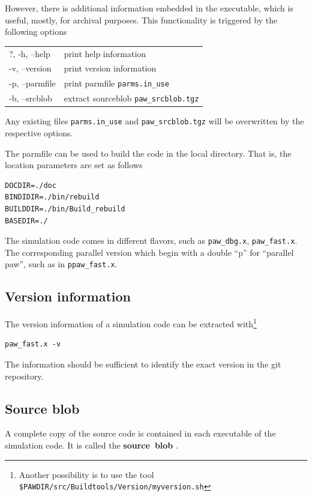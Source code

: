 \documentclass[final,12pt,makeidx,DIV=calc]{article}
\begin{document}
{{{However, there is additional information embedded in the executable,
which is useful, mostly, for archival purposes. This functionality is
triggered by the following options
\begin{center}
\begin{tabular}{ll}
?, -h, --help & print help information\\
-v, --version & print version information\\
-p, --parmfile & print parmfile \verb|parms.in_use|\\
-b, --srcblob  & extract sourceblob \verb|paw_srcblob.tgz| \\
\end{tabular}
\end{center}
Any existing files \verb|parms.in_use| and \verb|paw_srcblob.tgz| will
be overwritten by the respective options.

The parmfile can be used to build the code in the local
directory. That is, the location  parameters are set as follows
\begin{verbatim}
DOCDIR=./doc
BINDIDIR=./bin/rebuild
BUILDDIR=./bin/Build_rebuild
BASEDIR=./
\end{verbatim}


The simulation code comes in different flavors, such as
\verb|paw_dbg.x|, \verb|paw_fast.x|. The corresponding parallel
version which begin with a double ``p'' for ``parallel paw'', such as
in \verb|ppaw_fast.x|.



\subsection{Version information}
The version information of a simulation code can be extracted
with\footnote{Another possibility is to use the tool
\texttt{\${PAWDIR}/src/Buildtools/Version/myversion.sh}}
\begin{verbatim}
paw_fast.x -v
\end{verbatim}
The information should be sufficient to identify the exact version in
the git repository.


\subsection{Source blob}
A complete copy of the source code is contained in each executable of
the simulation code. It is called the \textbf{source~blob}
.

}}}
\end{document}
